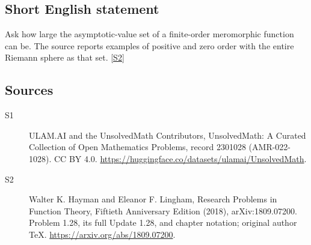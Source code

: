 \documentclass[11pt]{article}
\newcommand{\sref}[2]{\hyperlink{source:#1:#2}{[S#2]}}
\begin{document}
\subsection{Short English statement}
Ask how large the asymptotic-value set of a finite-order meromorphic function can be. The source reports examples of positive and zero order with the entire Riemann sphere as that set. \sref{2301028}{2}
\subsection{Sources}
\begin{description}
\item[\hypertarget{source:2301028:1}{S1}] ULAM.AI and the UnsolvedMath Contributors, UnsolvedMath: A Curated Collection of Open Mathematics Problems, record 2301028 (AMR-022-1028). CC BY 4.0. \url{https://huggingface.co/datasets/ulamai/UnsolvedMath}.
\item[\hypertarget{source:2301028:2}{S2}] Walter K. Hayman and Eleanor F. Lingham, Research Problems in Function Theory, Fiftieth Anniversary Edition (2018), arXiv:1809.07200. Problem 1.28, its full Update 1.28, and chapter notation; original author TeX. \url{https://arxiv.org/abs/1809.07200}.
\end{description}
\label{end:2301028}
\end{document}
